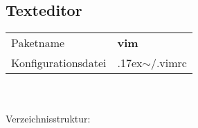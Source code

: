 \subsection{Texteditor}
\begin{tabular}{l|l}
Paketname & \textbf{vim} \\ 
Konfigurationsdatei & {{\raise.17ex\hbox{$\scriptstyle\mathtt{\sim}$}}/.vimrc} \\
\end{tabular}
\\ \\
Verzeichnisstruktur:  
